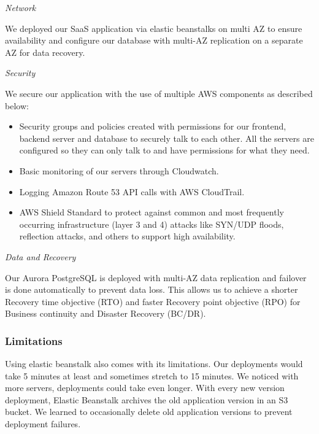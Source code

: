 \documentclass[12pt,a4paper]{article}
\begin{document}
            \textit{Network}
            
            We deployed our SaaS application via elastic beanstalks on multi AZ to ensure availability and configure our database with multi-AZ replication on a separate AZ for data recovery.
            
            \textit{Security}
            
            We secure our application with the use of multiple AWS components as described below:
            \begin{itemize}
                \item Security groups and policies created with permissions for our frontend, backend server and database to securely talk to each other. All the servers are configured so they can only talk to and have permissions for what they need.
                \item Basic monitoring of our servers through Cloudwatch.
                \item Logging Amazon Route 53 API calls with AWS CloudTrail.
                \item AWS Shield Standard to protect against common and most frequently occurring infrastructure (layer 3 and 4) attacks like SYN/UDP floods, reflection attacks, and others to support high availability.
            \end{itemize}
            
            \textit{Data and Recovery}
            
            Our Aurora PostgreSQL is deployed with multi-AZ data replication and failover is done automatically to prevent data loss. This allows us to achieve a shorter Recovery time objective (RTO) and faster Recovery point objective (RPO) for Business continuity and Disaster Recovery (BC/DR).

        \subsubsection{Limitations}
        
        Using elastic beanstalk also comes with its limitations. Our deployments would take 5 minutes at least and sometimes stretch to 15 minutes. We noticed with more servers, deployments could take even longer. With every new version deployment, Elastic Beanstalk archives the old application version in an S3 bucket. We learned to occasionally delete old application versions to prevent deployment failures.
\end{document}
